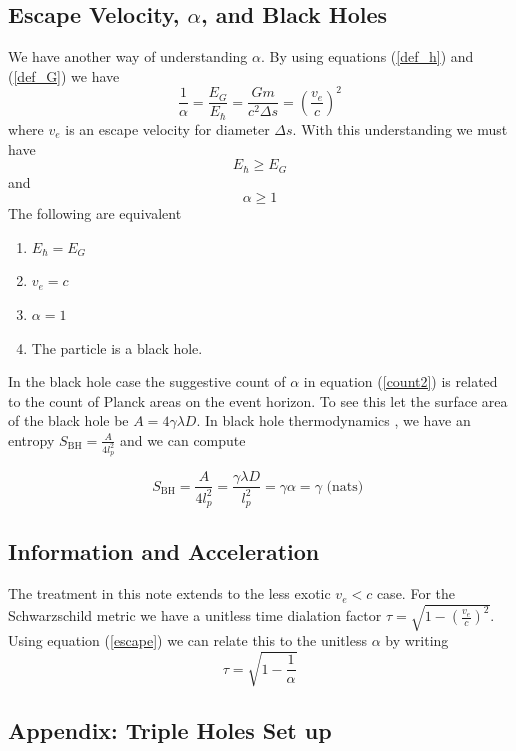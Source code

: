 \documentclass[12pt,a4paper]{article}
\begin{document}
\subsection{Escape Velocity, $\alpha$, and Black Holes}
We have another way of understanding $\alpha$.  By using equations (\ref{def_h}) and (\ref{def_G}) we have
\begin{equation}
\label{escape}
  \frac{1}{\alpha} = \frac{E_G}{E_\hslash} = \frac{Gm}{c^2\Delta s} = \left(\frac{v_e}{c}\right)^2
\end{equation}
where $v_e$ is an escape velocity for diameter $\Delta s$.  With this understanding we must have
\begin{equation}
\label{ine}
   E_\hslash \ge E_G
\end{equation}
and
\begin{equation}
\label{alphaone}
  \alpha \ge 1 
\end{equation}
The following are equivalent
\begin{enumerate}
\item $E_\hslash = E_G$
\item $v_e = c$
\item $\alpha = 1$
\item The particle is a black hole.
\end{enumerate}
In the black hole case the suggestive count of $\alpha$ in equation (\ref{count2}) is related to the count of Planck areas on the event horizon.  To see this let the surface area of the black hole be $A = 4 \gamma \lambda D$.  In black hole thermodynamics \cite{bekenstein}, we have an entropy $S_\text{BH} = \frac{A}{4 l_p^2}$ and we can compute

\[
  S_\text{BH} = \frac{A}{4 l_p^2} = \frac{\gamma \lambda D}{l_p^2} = \gamma \alpha = \gamma \text{ (nats) }
\]

\subsection{Information and Acceleration}

The treatment in this note extends to the less exotic $v_e < c$ case.  For the Schwarzschild metric we have a unitless time dialation factor $\tau = \sqrt{1 - \left(\frac{v_e}{c}\right)^2}$.  Using equation (\ref{escape}) we can relate this to the unitless $\alpha$ by writing
\[
\tau = \sqrt{1 - \frac{1}{\alpha}}
\]


\subsection{Appendix: Triple Holes Set up}
\end{document}
